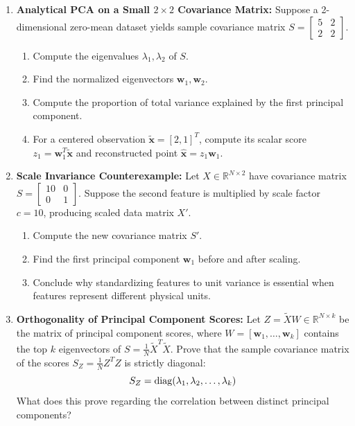 \begin{enumerate}[label=\textbf{P\arabic*.}]
    \item \textbf{Analytical PCA on a Small $2 \times 2$ Covariance Matrix:}
    Suppose a 2-dimensional zero-mean dataset yields sample covariance matrix $S = \begin{bmatrix} 5 & 2 \\ 2 & 2 \end{bmatrix}$.
    \begin{enumerate}[label=(\alph*)]
        \item Compute the eigenvalues $\lambda_1, \lambda_2$ of $S$.
        \item Find the normalized eigenvectors $\mathbf{w}_1, \mathbf{w}_2$.
        \item Compute the proportion of total variance explained by the first principal component.
        \item For a centered observation $\tilde{\mathbf{x}} = [2, 1]^T$, compute its scalar score $z_1 = \mathbf{w}_1^T \tilde{\mathbf{x}}$ and reconstructed point $\hat{\mathbf{x}} = z_1 \mathbf{w}_1$.
    \end{enumerate}

    \item \textbf{Scale Invariance Counterexample:}
    Let $X \in \mathbb{R}^{N \times 2}$ have covariance matrix $S = \begin{bmatrix} 10 & 0 \\ 0 & 1 \end{bmatrix}$.
    Suppose the second feature is multiplied by scale factor $c = 10$, producing scaled data matrix $X'$.
    \begin{enumerate}[label=(\alph*)]
        \item Compute the new covariance matrix $S'$.
        \item Find the first principal component $\mathbf{w}_1$ before and after scaling.
        \item Conclude why standardizing features to unit variance is essential when features represent different physical units.
    \end{enumerate}

    \item \textbf{Orthogonality of Principal Component Scores:}
    Let $Z = \tilde{X} W \in \mathbb{R}^{N \times k}$ be the matrix of principal component scores, where $W = [\mathbf{w}_1, \dots, \mathbf{w}_k]$ contains the top $k$ eigenvectors of $S = \frac{1}{N}\tilde{X}^T \tilde{X}$.
    Prove that the sample covariance matrix of the scores $S_Z = \frac{1}{N} Z^T Z$ is strictly diagonal:
    \begin{equation}
    S_Z = \operatorname{diag}(\lambda_1, \lambda_2, \dots, \lambda_k)
    \end{equation}
    What does this prove regarding the correlation between distinct principal components?


\end{enumerate}
